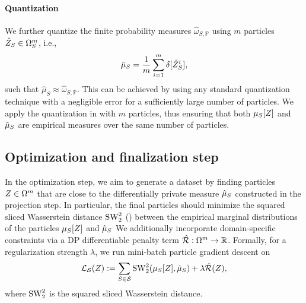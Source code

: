 \paragraph{Quantization} We further quantize the finite probability measures $\hat \omega_{S, \mathbb P}$ using $m$ particles 
$\hat {Z}_S \in \Omega^m_S$, i.e., 
\begin{equation}
    \hat \mu_{S} = \frac{1}{m} \sum_{i=1}^m \delta[\hat {Z}_S^i],
    \label{eq:quant}
\end{equation}
such that $\hat \mu_S \approx \hat \omega_{S, \mathbb P}$. 
  This can be achieved by using any standard quantization technique with a negligible error for a sufficiently large number of particles.
  We apply the quantization in  with $m$ particles, thus ensuring that both $\mu_{S}[Z]$ and $  \hat \mu_{S} $ are empirical measures over the same number of particles. 
  
\subsection{Optimization and finalization step}

\label{subsec:optimization}
In the optimization step, we aim to generate a dataset by finding particles $Z \in \Omega^m$  that are close to the differentially private measure $\hat \mu_{S}$ constructed in the projection step.
In particular, the final particles should minimize the squared sliced Wasserstein distance $\text{SW}_2^2$ () between the empirical marginal distributions of the particles $\mu_{S}[Z]$ and $\hat \mu_{S}$
We additionally incorporate domain-specific constraints via a DP differentiable penalty term $\hat {\mathcal R}: \Omega^m \to \mathbb R$. 
Formally, for a regularization  strength $\lambda$, we
 run mini-batch particle gradient descent on
\begin{equation}
\label{eq:loss_gd}
   \mathcal L_{\mathcal S}(Z) :=  \sum_{S \in \mathcal S} \text{SW}_2^2(\mu_{S}[Z], \hat \mu_{S} )+ \lambda \hat {\mathcal R}(Z),
\end{equation}
where $\text{SW}_2^2$ is the squared sliced Wasserstein distance.  
